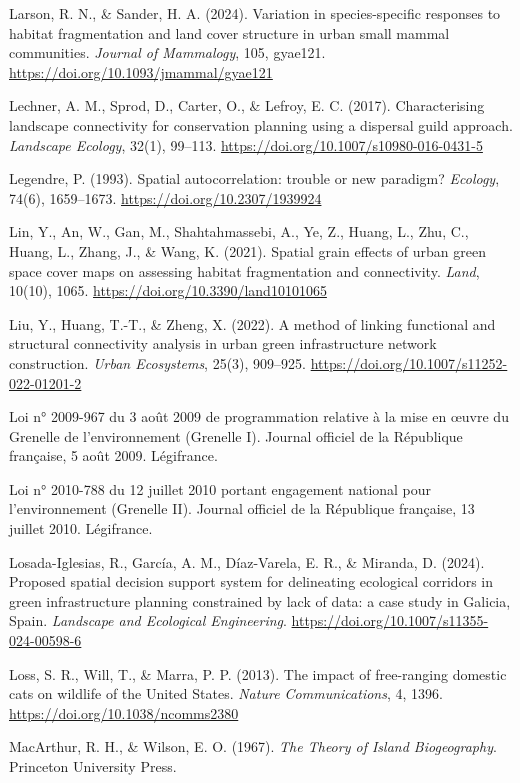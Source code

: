 \documentclass[a4paper,11pt]{report}
\begin{document}
Larson, R. N., \& Sander, H. A. (2024). Variation in species-specific responses to habitat fragmentation and land cover structure in urban small mammal communities. \textit{Journal of Mammalogy}, 105, gyae121. \url{https://doi.org/10.1093/jmammal/gyae121}

Lechner, A. M., Sprod, D., Carter, O., \& Lefroy, E. C. (2017). Characterising landscape connectivity for conservation planning using a dispersal guild approach. \textit{Landscape Ecology}, 32(1), 99--113. \url{https://doi.org/10.1007/s10980-016-0431-5}

Legendre, P. (1993). Spatial autocorrelation: trouble or new paradigm? \textit{Ecology}, 74(6), 1659--1673. \url{https://doi.org/10.2307/1939924}

Lin, Y., An, W., Gan, M., Shahtahmassebi, A., Ye, Z., Huang, L., Zhu, C., Huang, L., Zhang, J., \& Wang, K. (2021). Spatial grain effects of urban green space cover maps on assessing habitat fragmentation and connectivity. \textit{Land}, 10(10), 1065. \url{https://doi.org/10.3390/land10101065}

Liu, Y., Huang, T.-T., \& Zheng, X. (2022). A method of linking functional and structural connectivity analysis in urban green infrastructure network construction. \textit{Urban Ecosystems}, 25(3), 909--925. \url{https://doi.org/10.1007/s11252-022-01201-2}

Loi n° 2009-967 du 3 août 2009 de programmation relative à la mise en \oe{}uvre du Grenelle de l'environnement (Grenelle I). Journal officiel de la République française, 5 août 2009. Légifrance.

Loi n° 2010-788 du 12 juillet 2010 portant engagement national pour l'environnement (Grenelle II). Journal officiel de la République française, 13 juillet 2010. Légifrance.

Losada-Iglesias, R., García, A. M., Díaz-Varela, E. R., \& Miranda, D. (2024). Proposed spatial decision support system for delineating ecological corridors in green infrastructure planning constrained by lack of data: a case study in Galicia, Spain. \textit{Landscape and Ecological Engineering}. \url{https://doi.org/10.1007/s11355-024-00598-6}

Loss, S. R., Will, T., \& Marra, P. P. (2013). The impact of free-ranging domestic cats on wildlife of the United States. \textit{Nature Communications}, 4, 1396. \url{https://doi.org/10.1038/ncomms2380}

MacArthur, R. H., \& Wilson, E. O. (1967). \textit{The Theory of Island Biogeography}. Princeton University Press.
\end{document}
